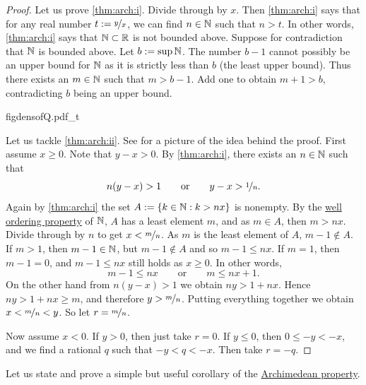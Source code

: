 \begin{proof}
Let us prove \ref{thm:arch:i}.  Divide through by $x$.
Then \ref{thm:arch:i} says that for any real number $t:= \nicefrac{y}{x}$,
we can find $n \in {\mathbb{N}}$ such that $n > t$.  In other words,
\ref{thm:arch:i} says that ${\mathbb{N}} \subset {\mathbb{R}}$ is not bounded above.
Suppose for contradiction that ${\mathbb{N}}$ is bounded above.  Let $b := \sup {\mathbb{N}}$.
The number $b-1$ cannot possibly be an upper bound for ${\mathbb{N}}$ as it is strictly
less than $b$ (the least upper bound).  Thus there exists an $m \in {\mathbb{N}}$ such that $m > b-1$.
Add one to obtain $m+1 > b$, contradicting $b$ being an
upper bound.

\begin{myfigureht}
{figdensofQ.pdf_t}
\caption{Idea of the proof of the density of $\Q$: Find $n$ such that $y-x >
\nicefrac{1}{n}$, then take the least $m$ such that $\nicefrac{m}{n} > x$.\label{figdensofQ}}
\end{myfigureht}
Let us tackle \ref{thm:arch:ii}.
See 
for a picture of the idea behind the proof.
First assume $x \geq 0$.
Note that $y-x > 0$.
By \ref{thm:arch:i}, there exists an $n \in {\mathbb{N}}$ such that
\begin{equation*}
n(y-x) > 1
\qquad \text{or} \qquad
y-x > \nicefrac{1}{n}.
\end{equation*}
Again by \ref{thm:arch:i} the set 
$A := \{ k \in {\mathbb{N}} : k > nx \}$ is nonempty.  By the
\hyperlink{wop:link}{well ordering property}
of ${\mathbb{N}}$, $A$ has a least element $m$, and as $m \in A$,
then $m > nx$.
Divide through by $n$ to get $x < \nicefrac{m}{n}$.
As $m$ is the least
element of $A$, $m-1 \notin A$.
If $m > 1$, then $m-1 \in {\mathbb{N}}$, but $m-1 \notin A$ and so $m-1 \leq nx$.
If $m=1$,
then $m-1 = 0$, and $m-1 \leq nx$ still holds as $x \geq 0$.
In other words,
\begin{equation*}
m-1 \leq nx \qquad \text{or} \qquad m \leq nx+1 .
\end{equation*}
On the other hand
from $n(y-x) > 1$ we obtain $ny > 1+nx$.
Hence $ny > 1+nx \geq m$, and therefore $y > \nicefrac{m}{n}$.
Putting everything together we obtain $x < \nicefrac{m}{n} < y$.
So let $r = \nicefrac{m}{n}$.

Now assume $x < 0$.  If $y > 0$, then just take $r=0$.  If
$y \leq 0$, then $0 \leq -y < -x$, and we
find a rational $q$ such that $-y < q < -x$.  Then take $r = -q$.
\end{proof}

Let us state and prove a simple but useful corollary of the
\hyperref[thm:arch:i]{Archimedean property}.

